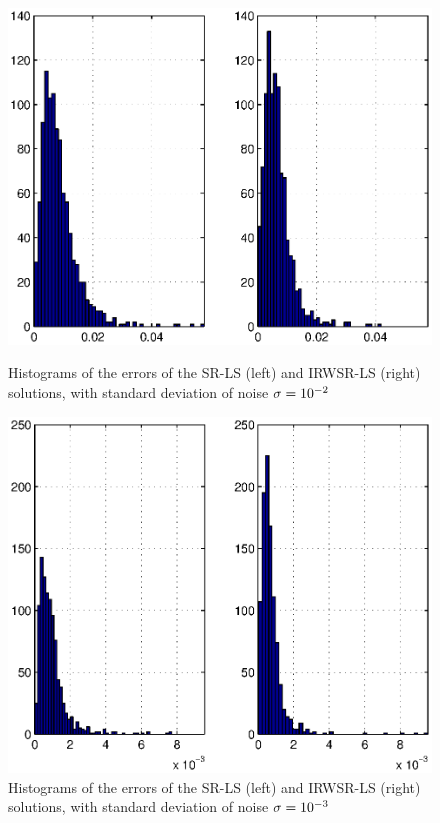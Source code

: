 
\begin{figure}[h]
\centering
\includegraphics[width=1\textwidth,height=0.42\textheight]{figures/range_dif_IRWLS/Noise02LeftBeckRightRD}%
\caption{Histograms of the errors of the SR-LS (left) and IRWSR-LS (right) solutions, with standard deviation of noise  $\protect\sigma = 10^{-2}$}
\label{fig:Noise02IRDW}
\centering
\includegraphics[width=1\textwidth,height=0.42\textheight]{figures/range_dif_IRWLS/Noise03LeftBeckRightRD}%
\caption{Histograms of the errors of the SR-LS (left) and IRWSR-LS (right) solutions, with standard deviation of noise  $\protect\sigma = 10^{-3}$}
\label{fig:Noise03IRDW}
\end{figure}

